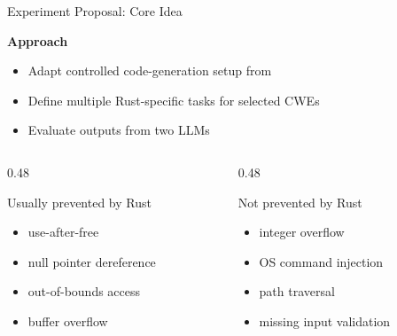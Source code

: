 
\begin{frame}{Experiment Proposal: Core Idea}

    \textbf{Approach}
    \begin{itemize}
        \item Adapt controlled code-generation setup from \cite{task_liu_2024}
        \item Define multiple Rust-specific tasks for selected CWEs
        \item Evaluate outputs from two LLMs
    \end{itemize}
        
    \begin{columns}
    \begin{column}{0.48\textwidth}
    \begin{block}{Usually prevented by Rust}
    \begin{itemize}
        \item use-after-free
        \item null pointer dereference
        \item out-of-bounds access
        \item buffer overflow
    \end{itemize}
    \end{block}
    \end{column}
    
    \begin{column}{0.48\textwidth}
    \begin{alertblock}{Not prevented by Rust}
    \begin{itemize}
        \item integer overflow
        \item OS command injection
        \item path traversal
        \item missing input validation
    \end{itemize}
    \end{alertblock}
    \end{column}
    \end{columns}


\end{frame}


